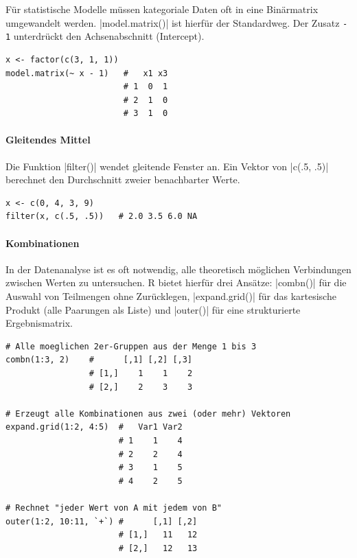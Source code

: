 \documentclass[10pt,twocolumn]{scrartcl}
\renewcommand{\lstinline}{\mycoloredinline}
\begin{document}
Für statistische Modelle müssen kategoriale Daten oft in eine Binärmatrix umgewandelt werden. \lstinline|model.matrix()| ist hierfür der Standardweg. Der Zusatz \texttt{- 1} unterdrückt den Achsenabschnitt (Intercept).

\begin{lstlisting}
x <- factor(c(3, 1, 1))
model.matrix(~ x - 1)   #   x1 x3
                        # 1  0  1
                        # 2  1  0
                        # 3  1  0
\end{lstlisting}

\paragraph{Gleitendes Mittel}

Die Funktion \lstinline|filter()| wendet gleitende Fenster an. Ein Vektor von \lstinline|c(.5, .5)| berechnet den Durchschnitt zweier benachbarter Werte.

\begin{lstlisting}
x <- c(0, 4, 3, 9)
filter(x, c(.5, .5))   # 2.0 3.5 6.0 NA
\end{lstlisting}

\paragraph{Kombinationen}

In der Datenanalyse ist es oft notwendig, alle theoretisch möglichen Verbindungen zwischen Werten zu untersuchen. R bietet hierfür drei Ansätze: \lstinline|combn()| für die Auswahl von Teilmengen ohne Zurücklegen, \lstinline|expand.grid()| für das kartesische Produkt (alle Paarungen als Liste) und \lstinline|outer()| für eine strukturierte Ergebnismatrix.

\begin{lstlisting}
# Alle moeglichen 2er-Gruppen aus der Menge 1 bis 3
combn(1:3, 2)    #      [,1] [,2] [,3]
                 # [1,]    1    1    2
                 # [2,]    2    3    3

# Erzeugt alle Kombinationen aus zwei (oder mehr) Vektoren
expand.grid(1:2, 4:5)  #   Var1 Var2
                       # 1    1    4
                       # 2    2    4
                       # 3    1    5
                       # 4    2    5

# Rechnet "jeder Wert von A mit jedem von B"
outer(1:2, 10:11, `+`) #      [,1] [,2]
                       # [1,]   11   12
                       # [2,]   12   13
\end{lstlisting}
\end{document}
